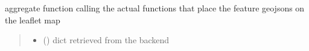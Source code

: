 \documentclass[letterpaper,10pt,english]{sphinxmanual}
\begin{document}

\begin{fulllineitems}
\label{\detokenize{docs_gui/js_api/network_editor/generate_editable_network:displayNetNew}}
\pysigstartsignatures
{}
\pysigstopsignatures
\sphinxAtStartPar
aggregate function calling the actual functions that place the feature geojsons on the leaflet map
\begin{quote}\begin{description}
\begin{itemize}
\item {} 
\sphinxAtStartPar
{} () \textendash{} dict retrieved from the backend

\end{itemize}

\end{description}\end{quote}

\end{fulllineitems}

\end{document}
